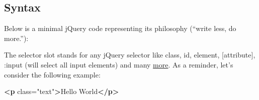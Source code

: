\documentclass[
]{book}
\newenvironment{Shaded}{\begin{snugshade}}{\end{snugshade}}
\newcommand{\AttributeTok}[1]{\textcolor[rgb]{0.77,0.63,0.00}{#1}}
\newcommand{\CommentTok}[1]{\textcolor[rgb]{0.56,0.35,0.01}{\textit{#1}}}
\newcommand{\DataTypeTok}[1]{\textcolor[rgb]{0.13,0.29,0.53}{#1}}
\newcommand{\KeywordTok}[1]{\textcolor[rgb]{0.13,0.29,0.53}{\textbf{#1}}}
\newcommand{\NormalTok}[1]{#1}
\newcommand{\OperatorTok}[1]{\textcolor[rgb]{0.81,0.36,0.00}{\textbf{#1}}}
\newcommand{\OtherTok}[1]{\textcolor[rgb]{0.56,0.35,0.01}{#1}}
\newcommand{\StringTok}[1]{\textcolor[rgb]{0.31,0.60,0.02}{#1}}
\begin{document}
\begin{Shaded}
\end{Shaded}

\hypertarget{syntax}{%
\subsection{Syntax}\label{syntax}}

Below is a minimal jQuery code representing its philosophy (``write less, do more.''):

\begin{Shaded}
\end{Shaded}

The selector slot stands for any jQuery selector like class, id, element, {[}attribute{]}, :input (will select all input elements) and many \href{https://www.w3schools.com/jquery/jquery_ref_selectors.asp}{more}. As a reminder, let's consider the following example:

\begin{Shaded}
\begin{Highlighting}[]
\KeywordTok{<p}\OtherTok{ class=}\StringTok{"text"}\KeywordTok{>}\NormalTok{Hello World}\KeywordTok{</p>}
\end{Highlighting}
\end{Shaded}
\end{document}
